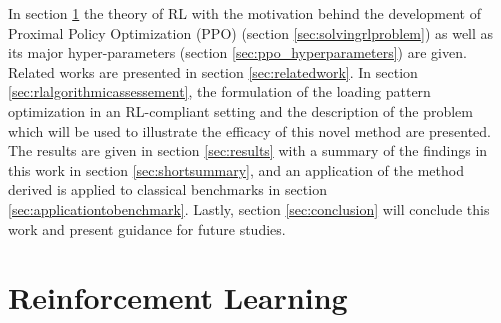 \documentclass[a4paper]{article}
\begin{document}
In section \ref{sec:reinforcement} the theory of RL with the motivation behind the development of Proximal Policy Optimization (PPO) (section \ref{sec:solvingrlproblem}) as well as its major hyper-parameters (section \ref{sec:ppo_hyperparameters}) are given. Related works are presented in section \ref{sec:relatedwork}. In section \ref{sec:rlalgorithmicassessement}, the formulation of the loading pattern optimization in an RL-compliant setting and the description of the problem which will be used to illustrate the efficacy of this novel method are presented. The results are given in section \ref{sec:results} with a summary of the findings in this work in section \ref{sec:shortsummary}, and an application of the method derived is applied to classical benchmarks in section \ref{sec:applicationtobenchmark}. Lastly, section \ref{sec:conclusion} will conclude this work and present guidance for future studies.

\section{Reinforcement Learning} 
\label{sec:reinforcement}
\end{document}
